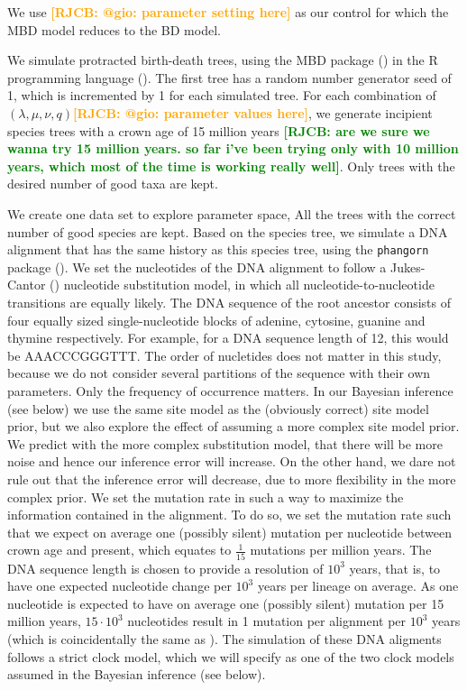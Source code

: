 \documentclass{article}
\newcommand*\richel[1]{\textcolor{orange}{\textbf{[RJCB: #1]}}}
\newcommand*\gio[1]{\textcolor{green}{\textbf{[RJCB: #1]}}}
\begin{document}
We use \richel{@gio: parameter setting here} as our control for which the MBD model reduces to the BD model.

We simulate protracted birth-death trees, using the MBD package (\cite{pbd}) in the R programming language (\cite{r}).
The first tree has a random number generator seed of 1, which is incremented by 1 for each simulated tree.
For each combination of $(\lambda, \mu, \nu, q) $\richel{@gio: parameter values here}, 
we generate incipient species trees with a crown age of 15 million years \gio{are we sure we wanna try 15 million years. so far i've been trying only with 10 million years, which most of the time is working really well}.
Only trees with the desired number of good taxa are kept.

We create one data set to explore parameter space, 
All the trees with the correct number of good species are kept.
Based on the species tree, we simulate a DNA alignment that has the same history
as this species tree, using the \verb;phangorn; package (\cite{phangorn}). 
We set the nucleotides of the DNA alignment to follow a Jukes-Cantor (\cite{jc69})
nucleotide substitution model, in which all nucleotide-to-nucleotide transitions
are equally likely. 
The DNA sequence of the root ancestor consists of four equally sized single-nucleotide 
blocks of adenine, cytosine, guanine and thymine respectively. 
For example, for a DNA sequence length of 12, this would be AAACCCGGGTTT. 
The order of nucletides does not matter in this study, 
because we do not consider several partitions of the sequence with their own parameters. 
Only the frequency of occurrence matters.
In our Bayesian inference (see below) we use the same site model as the (obviously correct) site model prior,
but we also explore the effect of assuming a more complex site model prior.
We predict with the more complex substitution model, 
that there will be more noise and hence our inference error will increase.
On the other hand, we dare not rule out that the inference error will decrease,
due to more flexibility in the more complex prior.
We set the mutation rate in such a way to maximize the information contained in the alignment.
To do so, we set the mutation rate such that we expect on average one (possibly silent) mutation per nucleotide
between crown age and present, which equates to $\frac{1}{15}$ mutations
per million years.
The DNA sequence length is chosen to provide a
resolution of $10^3$ years, 
that is, to have one expected nucleotide change 
per $10^3$ years per lineage on average. As one nucleotide is expected 
to have on average one (possibly silent) mutation per 15 million years, $15 \cdot 10^3$
nucleotides result in 1 mutation per alignment per $10^3$ years (which is
coincidentally the same as \cite{moller2018}). 
The simulation of these DNA aligments follows a strict clock model, 
which we will specify as one of the two clock models assumed in the Bayesian inference (see below).
\end{document}

